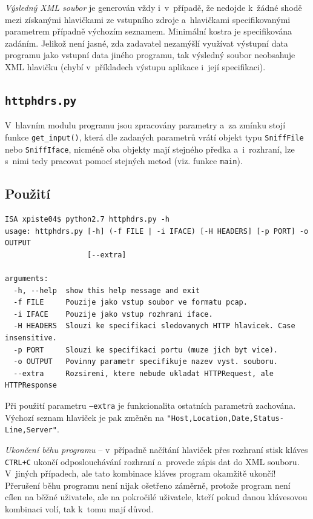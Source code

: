 \documentclass[a4paper, 11pt, titlepage]{article}
\begin{document}
	\textit{Výsledný XML soubor} je generován vždy i~v~případě, že nedojde k~žádné shodě mezi získanými hlavičkami 
	ze vstupního zdroje a~hlavičkami specifikovanými parametrem případně výchozím seznamem. Minimální kostra je specifikována 
	zadáním. Jelikož není jasné, zda zadavatel nezamýšlí využívat výstupní data programu jako vstupní data jiného programu,
	tak výsledný soubor neobsahuje XML hlavičku (chybí v~příkladech výstupu aplikace i~její specifikaci).

	\subsection{\texttt{httphdrs.py}} %
	\label{sub:httphdrs}
	V~hlavním modulu programu jsou zpracovány parametry a~za zmínku stojí funkce \texttt{get\_input()}, která dle zadaných 
	parametrů vrátí objekt typu \texttt{SniffFile} nebo \texttt{SniffIface}, nicméně oba objekty mají stejného předka
	a~i~rozhraní, lze s~nimi tedy pracovat pomocí stejných metod (viz. funkce \texttt{main}). 

	\subsection{Použití} %
	\label{sub:pouziti}
	
\lstset{tabsize=2, breaklines, frame=single, basicstyle=\small}
\begin{lstlisting} 
ISA xpiste04$ python2.7 httphdrs.py -h
usage: httphdrs.py [-h] (-f FILE | -i IFACE) [-H HEADERS] [-p PORT] -o OUTPUT
                   [--extra]

arguments:
  -h, --help  show this help message and exit
  -f FILE     Pouzije jako vstup soubor ve formatu pcap.
  -i IFACE    Pouzije jako vstup rozhrani iface.
  -H HEADERS  Slouzi ke specifikaci sledovanych HTTP hlavicek. Case insensitive. 
  -p PORT     Slouzi ke specifikaci portu (muze jich byt vice).
  -o OUTPUT   Povinny parametr specifikuje nazev vyst. souboru.
  --extra     Rozsireni, ktere nebude ukladat HTTPRequest, ale HTTPResponse
\end{lstlisting}

	Při použití parametru \texttt{--extra} je funkcionalita ostatních parametrů zachována.
	Výchozí seznam hlaviček je pak změněn na \texttt{"Host,Location,Date,Status-Line,Server"}.

	\textit{Ukončení běhu programu} -- v~případně načítání hlaviček přes rozhraní stisk kláves
	\texttt{CTRL+C} ukončí odposlouchávání rozhraní a~provede zápis dat do XML souboru. V~jiných 
	případech, ale tato kombinace kláves program okamžitě ukončí!
	Přerušení běhu programu není nijak ošetřeno záměrně, protože program není cílen na běžné
	uživatele, ale na pokročilé uživatele, kteří pokud danou klávesovou kombinaci volí, 
	tak k~tomu mají důvod.
\end{document}
